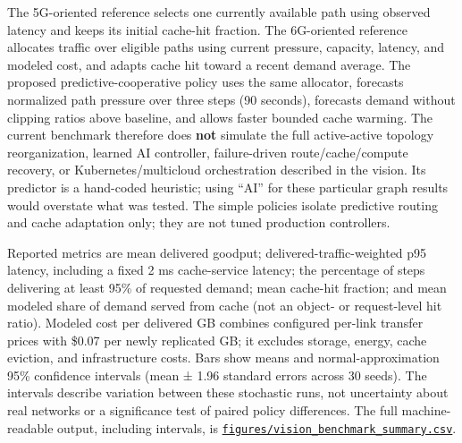 \documentclass[
  american,
  11pt,
]{article}
\begin{document}
The 5G-oriented reference selects one currently available path using
observed latency and keeps its initial cache-hit fraction. The
6G-oriented reference allocates traffic over eligible paths using
current pressure, capacity, latency, and modeled cost, and adapts cache
hit toward a recent demand average. The proposed predictive-cooperative
policy uses the same allocator, forecasts normalized path pressure over
three steps (90 seconds), forecasts demand without clipping ratios above
baseline, and allows faster bounded cache warming. The current benchmark
therefore does \textbf{not} simulate the full active-active topology
reorganization, learned AI controller, failure-driven
route/cache/compute recovery, or Kubernetes/multicloud orchestration
described in the vision. Its predictor is a hand-coded heuristic; using
``AI'' for these particular graph results would overstate what was
tested. The simple policies isolate predictive routing and cache
adaptation only; they are not tuned production controllers.

Reported metrics are mean delivered goodput; delivered-traffic-weighted
p95 latency, including a fixed 2 ms cache-service latency; the
percentage of steps delivering at least 95\% of requested demand; mean
cache-hit fraction; and mean modeled share of demand served from cache
(not an object- or request-level hit ratio). Modeled cost per delivered
GB combines configured per-link transfer prices with \$0.07 per newly
replicated GB; it excludes storage, energy, cache eviction, and
infrastructure costs. Bars show means and normal-approximation 95\%
confidence intervals (mean ± 1.96 standard errors across 30 seeds). The
intervals describe variation between these stochastic runs, not
uncertainty about real networks or a significance test of paired policy
differences. The full machine-readable output, including intervals, is
\href{../figures/vision_benchmark_summary.csv}{\texttt{figures/vision\_benchmark\_summary.csv}}.
\end{document}
